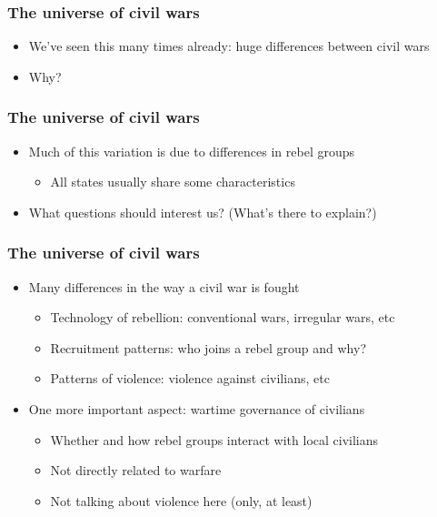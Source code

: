 \documentclass[utf8, xcolor=dvipsnames]{beamer}
\begin{document}
\begin{frame}
\frametitle{The universe of civil wars}
\centering

\begin{itemize}
  \item We've seen this many times already: huge differences between civil wars
  \item Why?
\end{itemize}

\end{frame}

\begin{frame}
\frametitle{The universe of civil wars}
\centering

\begin{itemize}[<+->]
  \item<1-> Much of this variation is due to differences in rebel groups
  \begin{itemize}
    \item All states usually share some characteristics
  \end{itemize}
  \item<2-> What questions should interest us? (What's there to explain?)
\end{itemize}

\end{frame}

\begin{frame}
\frametitle{The universe of civil wars}
\centering

\begin{itemize}
  \item<1-> Many differences in the way a civil war is fought
  \begin{itemize}
    \item Technology of rebellion: conventional wars, irregular wars, etc
    \item Recruitment patterns: who joins a rebel group and why?
    \item Patterns of violence: violence against civilians, etc
  \end{itemize}
  \item<2-> One more important aspect: wartime governance of civilians
  \begin{itemize}
    \item Whether and how rebel groups interact with local civilians
    \item Not directly related to warfare
    \item Not talking about violence here (only, at least)
  \end{itemize}
\end{itemize}

\end{frame}
\end{document}
